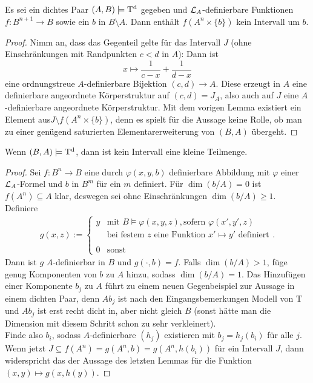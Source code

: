 \newpage

\begin{corollary}
	Es sei ein dichtes Paar $(A,B)\models\operatorname{T^d}$ gegeben und $\mathcal{L}_A$-definierbare Funktionen $f:B^{n+1}\rightarrow B$ sowie ein $b$ in $B\setminus A$. Dann enthält $f(A^n\times\{b\})$ kein Intervall um $b$.
\end{corollary}
\begin{proof}
	Nimm an, dass das Gegenteil gelte für das Intervall $J$ (ohne Einschränkungen mit Randpunkten $c<d$ in $A$): Dann ist $$x\mapsto\frac{1}{c-x}+\frac{1}{d-x}$$ eine ordnungstreue $A$-definierbare Bijektion $(c,d)\rightarrow A$. Diese erzeugt in $A$ eine definierbare angeordnete Körperstruktur auf $(c,d)=J_A$, also auch auf $J$ eine $A$-definierbare angeordnete Körperstruktur. Mit dem vorigen Lemma existiert ein Element aus\linebreak$J\setminus f(A^n\times\{b\})$, denn es spielt für die Aussage keine Rolle, ob man zu einer genügend saturierten Elementarerweiterung von $(B,A)$ übergeht.
\end{proof}

\begin{theorem}\label{Kleinheit}
	Wenn $(B,A)\models\operatorname{T^d}$, dann ist kein Intervall eine kleine Teilmenge.
\end{theorem}
\begin{proof}
	Sei $f:B^n\rightarrow B$ eine durch $\varphi(x,y,b)$ definierbare Abbildung mit $\varphi$ einer\linebreak$\mathcal{L}_A$-Formel und $b$ in $B^m$ für ein $m$ definiert. Für $\dim(b/A)=0$ ist $f(A^n)\subseteq A$ klar, deswegen sei ohne Einschränkungen $\dim(b/A)\geq1$. Definiere
	\begin{align*}
	g(x,z):=\left\{\begin{array}{ll}
	y&\text{mit }B\models\varphi(x,y,z),\text{sofern }\varphi(x',y',z)\\
	&\text{bei festem }z\text{ eine Funktion }x'\mapsto y'\text{ definiert}\\
	\ &\ \\
	0 &\text{sonst}
	\end{array}\right..
	\end{align*}
	Dann ist $g$ $A$-definierbar in $B$ und $g(\cdot,b)=f$. Falls $\dim(b/A)>1$, füge genug Komponenten von $b$ zu $A$ hinzu, sodass $\dim(b/A)=1$. Das Hinzufügen einer Komponente $b_j$ zu $A$ führt zu einem neuen Gegenbeispiel zur Aussage in einem dichten Paar, denn $Ab_j$ ist nach den Eingangsbemerkungen Modell von T und $Ab_j$ ist erst recht dicht in, aber nicht gleich $B$ (sonst hätte man die Dimension mit diesem Schritt schon zu sehr verkleinert).\\
	Finde also $b_i$, sodass $A$-definierbare $(h_j)$ existieren mit $b_j=h_j(b_i)$ für alle $j$. Wenn jetzt $J\subseteq f(A^n)=g(A^n,b)=g(A^n,h(b_i))$ für ein Intervall $J$, dann widerspricht das der Aussage des letzten Lemmas für die Funktion $(x,y)\mapsto g(x,h(y))$.
\end{proof}

